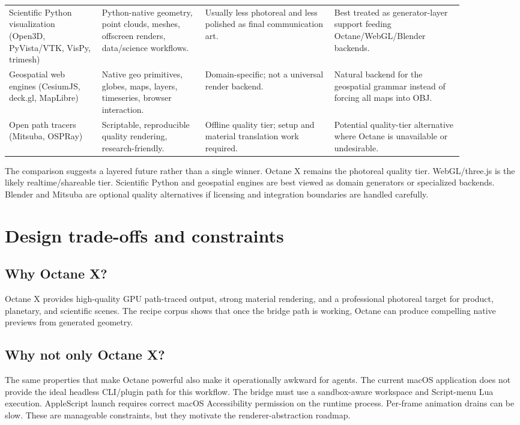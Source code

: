 \documentclass[11pt,a4paper]{article}
\begin{document}
\begin{longtable}{p{0.18\linewidth}p{0.20\linewidth}p{0.25\linewidth}p{0.25\linewidth}}
\addlinespace
Scientific Python visualization (Open3D, PyVista/VTK, VisPy, trimesh) & Python-native geometry, point clouds, meshes, offscreen renders, data/science workflows. & Usually less photoreal and less polished as final communication art. & Best treated as generator-layer support feeding Octane/WebGL/Blender backends. \\
\addlinespace
Geospatial web engines (CesiumJS, deck.gl, MapLibre) & Native geo primitives, globes, maps, layers, timeseries, browser interaction. & Domain-specific; not a universal render backend. & Natural backend for the geospatial grammar instead of forcing all maps into OBJ. \\
\addlinespace
Open path tracers (Mitsuba, OSPRay) & Scriptable, reproducible quality rendering, research-friendly. & Offline quality tier; setup and material translation work required. & Potential quality-tier alternative where Octane is unavailable or undesirable. \\
\bottomrule
\end{longtable}

The comparison suggests a layered future rather than a single winner. Octane X remains the photoreal quality tier. WebGL/three.js is the likely realtime/shareable tier. Scientific Python and geospatial engines are best viewed as domain generators or specialized backends. Blender and Mitsuba are optional quality alternatives if licensing and integration boundaries are handled carefully.

\section{Design trade-offs and constraints}

\subsection{Why Octane X?}

Octane X provides high-quality GPU path-traced output, strong material rendering, and a professional photoreal target for product, planetary, and scientific scenes. The recipe corpus shows that once the bridge path is working, Octane can produce compelling native previews from generated geometry.

\subsection{Why not only Octane X?}

The same properties that make Octane powerful also make it operationally awkward for agents. The current macOS application does not provide the ideal headless CLI/plugin path for this workflow. The bridge must use a sandbox-aware workspace and Script-menu Lua execution. AppleScript launch requires correct macOS Accessibility permission on the runtime process. Per-frame animation drains can be slow. These are manageable constraints, but they motivate the renderer-abstraction roadmap.
\end{document}
